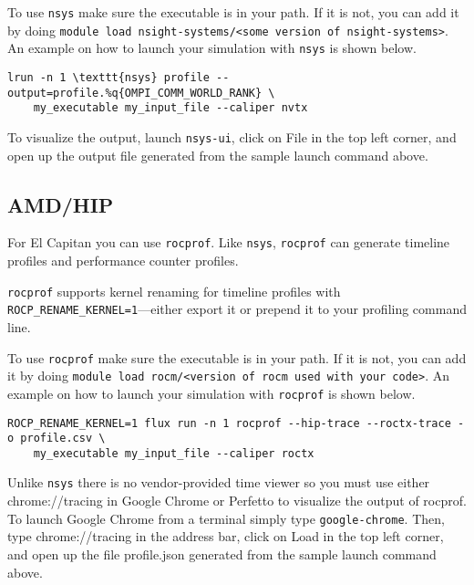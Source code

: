 \documentclass[a4paper,11pt]{article}
\begin{document}
To use \texttt{nsys} make sure the executable is in your path. If it is not, you can add it by doing \texttt{module load nsight-systems/<some version of nsight-systems>}. An example on how to launch your simulation with \texttt{nsys} is shown below.

\begin{verbatim}
lrun -n 1 \texttt{nsys} profile --output=profile.%q{OMPI_COMM_WORLD_RANK} \
    my_executable my_input_file --caliper nvtx
\end{verbatim}

To visualize the output, launch \texttt{nsys-ui}, click on File in the top left corner, and open up the output file generated from the sample launch command above.

\subsection{AMD/HIP}

For El Capitan you can use \texttt{rocprof}. Like \texttt{nsys}, \texttt{rocprof} can generate timeline profiles and performance counter profiles.

\texttt{rocprof} supports kernel renaming for timeline profiles with \texttt{ROCP\_RENAME\_KERNEL=1}---either export it or prepend it to your profiling command line.

To use \texttt{rocprof} make sure the executable is in your path. If it is not, you can add it by doing \texttt{module load rocm/<version of rocm used with your code>}. An example on how to launch your simulation with \texttt{rocprof} is shown below.
\begin{verbatim}
ROCP_RENAME_KERNEL=1 flux run -n 1 rocprof --hip-trace --roctx-trace -o profile.csv \
    my_executable my_input_file --caliper roctx
\end{verbatim}

Unlike \texttt{nsys} there is no vendor-provided time viewer so you must use either chrome://tracing in Google Chrome or Perfetto to visualize the output of rocprof. To launch Google Chrome from a terminal simply type \texttt{google-chrome}. Then, type chrome://tracing in the address bar, click on Load in the top left corner, and open up the file profile.json generated from the sample launch command above.
\end{document}
